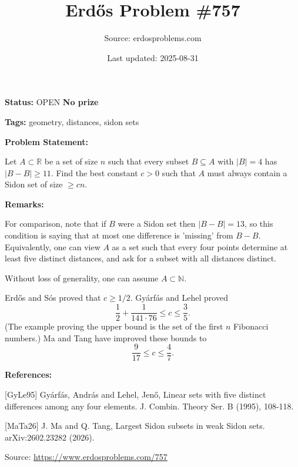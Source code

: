 \documentclass{article}
\title{Erd\H{o}s Problem \#757}
\date{Last updated: 2025-08-31}
\author{Source: erdosproblems.com}
\begin{document}
\maketitle

\noindent\textbf{Status:} OPEN \quad \textbf{No prize}

\noindent\textbf{Tags:} geometry, distances, sidon sets

\medskip
\noindent\textbf{Problem Statement:}

Let $A\subset \mathbb{R}$ be a set of size $n$ such that every subset $B\subseteq A$ with $\lvert B\rvert =4$ has $\lvert B-B\rvert\geq 11$. Find the best constant $c>0$ such that $A$ must always contain a Sidon set of size $\geq cn$.

\bigskip
\noindent\textbf{Remarks:}

For comparison, note that if $B$ were a Sidon set then $\lvert B-B\rvert=13$, so this condition is saying that at most one difference is 'missing' from $B-B$. Equivalently, one can view $A$ as a set such that every four points determine at least five distinct distances, and ask for a subset with all distances distinct.

Without loss of generality, one can assume $A\subset \mathbb{N}$. 

Erd\H{o}s and S\'{o}s proved that $c\geq 1/2$. Gy\'{a}rf\'{a}s and Lehel \cite{GyLe95} proved\[\frac{1}{2}+\frac{1}{141\cdot 76}\leq c\leq\frac{3}{5}.\](The example proving the upper bound is the set of the first $n$ Fibonacci numbers.)
Ma and Tang \cite{MaTa26} have improved these bounds to\[\frac{9}{17}\leq c\leq \frac{4}{7}.\]

\bigskip
\noindent\textbf{References:}

[GyLe95] Gy\'{a}rf\'{a}s, Andr\'{a}s and Lehel, Jen\H{o}, Linear sets with five distinct differences among any four
elements. J. Combin. Theory Ser. B (1995), 108-118.
 
 [MaTa26] J. Ma and Q. Tang, Largest Sidon subsets in weak Sidon sets. arXiv:2602.23282 (2026).

\bigskip
\noindent\small{Source: \url{https://www.erdosproblems.com/757}}
\end{document}
